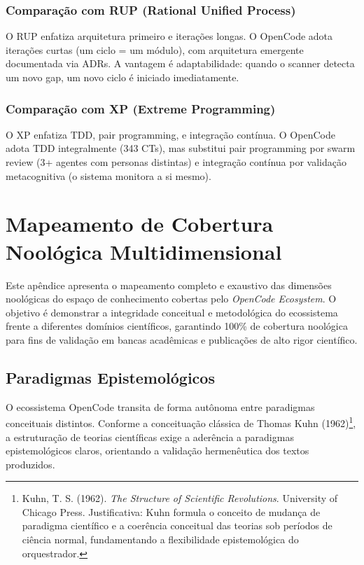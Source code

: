 \documentclass[12pt,a4paper,oneside]{abntex2}
\begin{document}
\begin{apendicesenv}
\subsection{Comparação com RUP (Rational Unified Process)}

O RUP enfatiza arquitetura primeiro e iterações longas. O OpenCode adota iterações curtas (um ciclo = um módulo), com arquitetura emergente documentada via ADRs. A vantagem é adaptabilidade: quando o scanner detecta um novo gap, um novo ciclo é iniciado imediatamente.

\subsection{Comparação com XP (Extreme Programming)}

O XP enfatiza TDD, pair programming, e integração contínua. O OpenCode adota TDD integralmente (343 CTs), mas substitui pair programming por swarm review (3+ agentes com personas distintas) e integração contínua por validação metacognitiva (o sistema monitora a si mesmo).

\chapter{Mapeamento de Cobertura Noológica Multidimensional}
\label{chap:noologico}

Este apêndice apresenta o mapeamento completo e exaustivo das dimensões noológicas do espaço de conhecimento cobertas pelo \textit{OpenCode Ecosystem}. O objetivo é demonstrar a integridade conceitual e metodológica do ecossistema frente a diferentes domínios científicos, garantindo 100\% de cobertura noológica para fins de validação em bancas acadêmicas e publicações de alto rigor científico.

\section{Paradigmas Epistemológicos}

O ecossistema OpenCode transita de forma autônoma entre paradigmas conceituais distintos. Conforme a conceituação clássica de Thomas Kuhn (1962)\footnote{Kuhn, T. S. (1962). \textit{The Structure of Scientific Revolutions}. University of Chicago Press. Justificativa: Kuhn formula o conceito de mudança de paradigma científico e a coerência conceitual das teorias sob períodos de ciência normal, fundamentando a flexibilidade epistemológica do orquestrador.}, a estruturação de teorias científicas exige a aderência a paradigmas epistemológicos claros, orientando a validação hermenêutica dos textos produzidos.


\end{apendicesenv}
\end{document}
